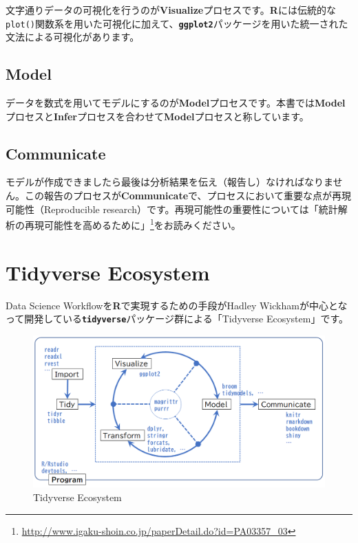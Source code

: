 \documentclass[
  12pt,
]{book}
\DeclareRobustCommand{\href}[2]{#2\footnote{\url{#1}}}
\begin{document}
文字通りデータの可視化を行うのが\textbf{Visualize}プロセスです。\textbf{R}には伝統的な\texttt{plot()}関数系を用いた可視化に加えて、\textbf{\texttt{ggplot2}}パッケージを用いた統一された文法による可視化があります。

\hypertarget{model}{%
\subsection*{Model}\label{model}}

データを数式を用いてモデルにするのが\textbf{Model}プロセスです。本書では\textbf{Model}プロセスと\textbf{Infer}プロセスを合わせて\textbf{Model}プロセスと称しています。

\hypertarget{communicate}{%
\subsection*{Communicate}\label{communicate}}

モデルが作成できましたら最後は分析結果を伝え（報告し）なければなりません。この報告のプロセスが\textbf{Communicate}で、プロセスにおいて重要な点が再現可能性（Reproducible research）です。再現可能性の重要性については\href{http://www.igaku-shoin.co.jp/paperDetail.do?id=PA03357_03}{「統計解析の再現可能性を高めるために」}をお読みください。

\hypertarget{tidyverse-ecosystem}{%
\section*{Tidyverse Ecosystem}\label{tidyverse-ecosystem}}

Data Science Workflowを\textbf{R}で実現するための手段がHadley Wickhamが中心となって開発している\textbf{\texttt{tidyverse}}パッケージ群による「Tidyverse Ecosystem」です。

\begin{figure}[H]

{\centering \includegraphics[width=0.9\linewidth,]{./fig/DSWF/tidyverse_eco_system} 

}

\caption{Tidyverse Ecosystem}\label{fig:unnamed-chunk-12}
\end{figure}
\end{document}
